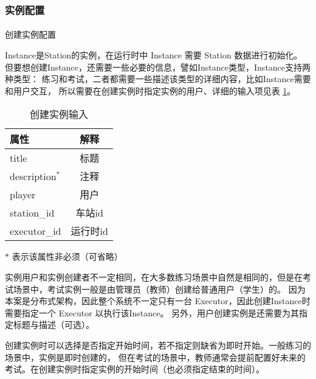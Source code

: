 \subsubsection{实例配置}

\paragraph{}创建实例配置

Instance是Station的实例，在运行时中 Instance 需要 Station 数据进行初始化。
但要想创建Instance，还需要一些必要的信息，譬如Instance类型，Instance支持两种类型：
练习和考试，二者都需要一些描述该类型的详细内容，比如Instance需要和用户交互，
所以需要在创建实例时指定实例的用户、详细的输入项见表 \ref{create_ins_in}。

\begin{table}[htpb!]
    \centering
    \caption{\label{create_ins_in}创建实例输入}
    \begin{threeparttable}
        \begin{tabular}{lc}
            \toprule
            属性            & 解释     \\
            \midrule
            title           & 标题     \\
            description$^*$ & 注释     \\
            player          & 用户     \\
            station\_id     & 车站id   \\
            executor\_id    & 运行时id \\
            \bottomrule
        \end{tabular}
        \begin{tablenotes}
            \footnotesize
            \item[$*$] 表示该属性非必须（可省略）
        \end{tablenotes}
    \end{threeparttable}
\end{table}

实例用户和实例创建者不一定相同，在大多数练习场景中自然是相同的，但是在考试场景中，考试实例一般是由管理员（教师）创建给普通用户（学生）的。
因为本案是分布式架构，因此整个系统不一定只有一台 Executor，因此创建Instance时需要指定一个 Executor 以执行该Instance。
另外，用户创建实例是还需要为其指定标题与描述（可选）。

创建实例时可以选择是否指定开始时间，若不指定则缺省为即时开始。一般练习的场景中，实例是即时创建的，
但在考试的场景中，教师通常会提前配置好未来的考试。在创建实例时指定实例的开始时间（也必须指定结束的时间）。

